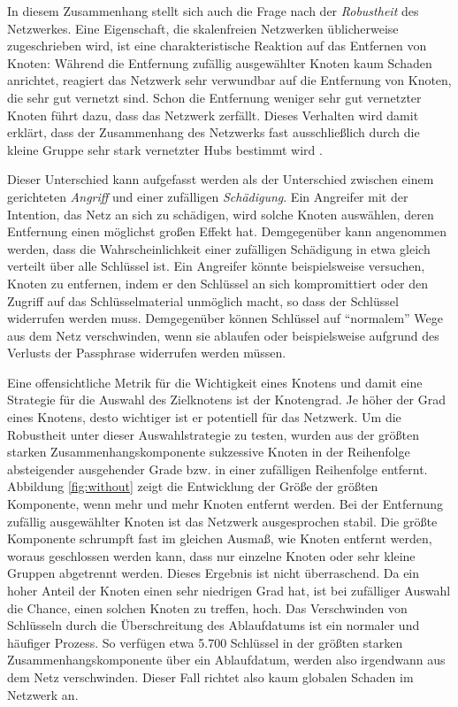 In diesem Zusammenhang stellt sich auch die Frage nach der
\emph{Robustheit} des Netzwerkes.  Eine Eigenschaft, die skalenfreien
Netzwerken üblicherweise zugeschrieben wird, ist eine
charakteristische Reaktion auf das Entfernen von Knoten: Während die
Entfernung zufällig ausgewählter Knoten kaum Schaden anrichtet,
reagiert das Netzwerk sehr verwundbar auf die Entfernung von Knoten,
die sehr gut vernetzt sind. Schon die Entfernung weniger sehr gut
vernetzter Knoten führt dazu, dass das Netzwerk
zerfällt. Dieses Verhalten wird damit erkl\"art, dass der Zusammenhang des
Netzwerks fast ausschlie{\ss}lich durch die kleine Gruppe sehr stark
vernetzter Hubs bestimmt wird \cite{Albert2000}.

Dieser Unterschied kann aufgefasst werden als der Unterschied zwischen
einem gerichteten \emph{Angriff} und einer zufälligen
\emph{Schädigung}. Ein Angreifer mit der Intention, das Netz an sich
zu schädigen, wird solche Knoten auswählen, deren Entfernung einen
möglichst großen Effekt hat. Demgegenüber kann angenommen werden,
dass die Wahrscheinlichkeit einer zufälligen Schädigung in etwa
gleich verteilt über alle Schlüssel ist. Ein Angreifer könnte
beispielsweise versuchen, Knoten zu entfernen, indem er den
Schlüssel an sich kompromittiert oder den Zugriff auf das
Schlüsselmaterial unmöglich macht, so dass der Schlüssel
widerrufen werden muss. Demgegenüber können Schlüssel auf
"`normalem"' Wege aus dem Netz verschwinden, wenn sie ablaufen oder
beispielsweise aufgrund des Verlusts der Passphrase widerrufen werden
müssen.

Eine offensichtliche Metrik für die Wichtigkeit eines Knotens und
damit eine Strategie für die Auswahl des Zielknotens ist der
Knotengrad. Je höher der Grad eines Knotens, desto wichtiger ist er
potentiell für das Netzwerk. Um die Robustheit unter dieser
Auswahlstrategie zu testen, wurden aus der größten starken
Zusammenhangskomponente sukzessive Knoten in der Reihenfolge
absteigender ausgehender Grade bzw. in einer zufälligen Reihenfolge
entfernt. Abbildung \ref{fig:without} zeigt die Entwicklung der Größe
der größten Komponente, wenn mehr und mehr Knoten entfernt werden. Bei
der Entfernung zufällig ausgewählter Knoten ist das Netzwerk
ausgesprochen stabil. Die größte Komponente schrumpft fast im gleichen
Ausma{\ss}, wie Knoten entfernt werden, woraus geschlossen werden kann,
dass nur einzelne Knoten oder sehr kleine Gruppen abgetrennt werden. Dieses Ergebnis ist nicht
überraschend. Da ein hoher Anteil der Knoten einen sehr niedrigen Grad
hat, ist bei zufälliger Auswahl die Chance, einen solchen Knoten zu
treffen, hoch. Das Verschwinden von Schlüsseln durch die
\"Uberschreitung des Ablaufdatums ist ein
normaler und häufiger Prozess. So verfügen etwa 5.700 Schlüssel in der
größten starken Zusammenhangskomponente über ein Ablaufdatum, werden
also irgendwann aus dem Netz verschwinden. Dieser Fall richtet also
kaum globalen Schaden im Netzwerk an.

